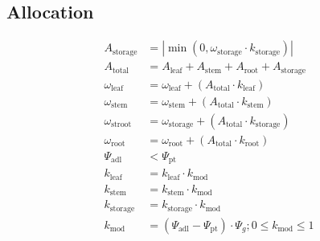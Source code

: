 \documentclass[10pt]{article}
\begin{document}
\subsection*{Allocation}

\begin{align}
A_{\text{storage}} &= |\min(0, \omega_{\text{storage}} \cdot k_{\text{storage}})|  \label{eqn:Astroot} \\
A_{\text{total}} &= A_{\text{leaf}} + A_{\text{stem}} + A_{\text{root}} + A_{\text{storage}}  \label{eqn:Atotal} \\
\omega_{\text{leaf}} &= \omega_{\text{leaf}} + (A_{\text{total}} \cdot k_{\text{leaf}}) \label{eqn:omegaleaf} \\
\omega_{\text{stem}} &= \omega_{\text{stem}} + (A_{\text{total}} \cdot k_{\text{stem}}) \label{eqn:omegastem} \\
 \omega_{\text{stroot}} &= \omega_{\text{storage}} + (A_{\text{total}} \cdot k_{\text{storage}})  \\
 \omega_{\text{root}} &= \omega_{\text{root}} + (A_{\text{total}} \cdot k_{\text{root}}) \label{eqn:omegaroot} \\
 \Psi_{\text{adl}} &< \Psi_{\text{pt}}  \\
 k_{\text{leaf}} &= k_{\text{leaf}} \cdot k_{\text{mod}} \\
 k_{\text{stem}} &= k_{\text{stem}} \cdot k_{\text{mod}} \\ 
 k_{\text{storage}} &= k_{\text{storage}} \cdot k_{\text{mod}}  \\ 
 k_{\text{mod}} &= (\Psi_{\text{adl}} - \Psi_{\text{pt}}) \cdot \Psi_g ; 0 \leq k_{\text{mod}} \leq 1 \label{eqn:kmod} \\

\end{align}
\end{document}
